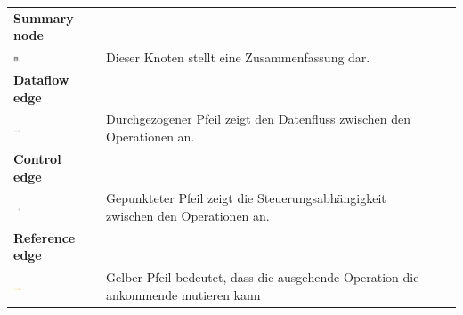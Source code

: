 \begin{tabular}{ p{4cm}p{10.8cm} ll }
\textbf{Summary node} \tabularnewline 
\includegraphics[width=0.07\textwidth]{images/Kapitel_3/Summary_node.png}
\label{fig:Summary_node}
 & Dieser Knoten stellt eine Zusammenfassung dar.  \tabularnewline 

\textbf{Dataflow edge} \tabularnewline 
\includegraphics[width=0.1\textwidth]{images/Kapitel_3/Dataflow_edge.png}
\label{fig:Dataflow_edge}
 & Durchgezogener Pfeil zeigt den Datenfluss zwischen den Operationen an.  \tabularnewline
 
\textbf{Control edge} \tabularnewline 
\includegraphics[width=0.1\textwidth]{images/Kapitel_3/Control_dependency_edge.png}
\label{fig:Control_dependendy_edge}
 & Gepunkteter Pfeil zeigt die Steuerungsabhängigkeit zwischen den Operationen an.  \tabularnewline 
 
\textbf{Reference edge} \tabularnewline 
\includegraphics[width=0.1\textwidth]{images/Kapitel_3/Reference_edge.png}
\label{fig:Reference_edge}
 & Gelber Pfeil bedeutet, dass die ausgehende Operation die ankommende mutieren kann   \tabularnewline 
\end{tabular}
\\
